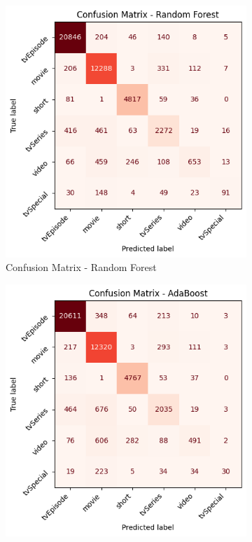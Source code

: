 \begin{figure}[H]
    \centering
    \begin{subfigure}[b]{0.49\textwidth}
        \centering
        \includegraphics[width=\textwidth]{plotsss/conf_matr_rf_titletype}
        \caption{Confusion Matrix - Random Forest}
        \label{fig:cm_rf}
    \end{subfigure}
    \hfill
    \begin{subfigure}[b]{0.49\textwidth}
        \centering
        \includegraphics[width=\textwidth]{plotsss/conf_matr_boost_titletype}

\end{subfigure}
\end{figure}
